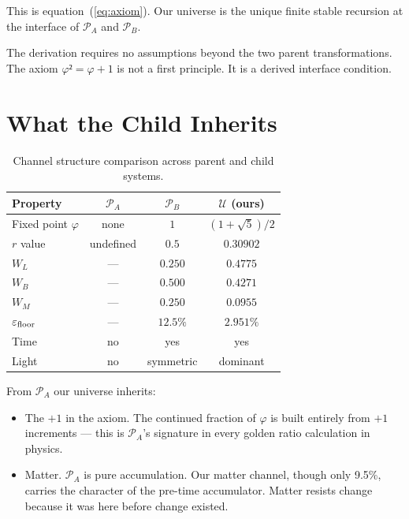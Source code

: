 \documentclass[prd,twocolumn,preprintnumbers,amsmath,amssymb]{revtex4-2}
\newcommand{\parentA}{\mathcal{P}_A}
\newcommand{\parentB}{\mathcal{P}_B}
\newcommand{\child}{\mathcal{U}}
\begin{document}
This is equation~(\ref{eq:axiom}). Our universe is the unique finite
stable recursion at the interface of $\parentA$ and $\parentB$.

The derivation requires no assumptions beyond the two parent
transformations. The axiom $φ² = φ + 1$ is not a first principle.
It is a derived interface condition.

\section{What the Child Inherits}

\begin{table}[h]
\caption{Channel structure comparison across parent and child systems.}
\begin{ruledtabular}
\begin{tabular}{lccc}
Property & $\parentA$ & $\parentB$ & $\child$ (ours) \\
\hline
Fixed point $\varphi$ & none & $1$ & $(1+\sqrt{5})/2$ \\
$r$ value & undefined & $0.5$ & $0.30902$ \\
$W_L$ & --- & $0.250$ & $0.4775$ \\
$W_B$ & --- & $0.500$ & $0.4271$ \\
$W_M$ & --- & $0.250$ & $0.0955$ \\
$\varepsilon_{\rm floor}$ & --- & $12.5\%$ & $2.951\%$ \\
Time & no & yes & yes \\
Light & no & symmetric & dominant \\
\end{tabular}
\end{ruledtabular}
\end{table}

From $\parentA$ our universe inherits:
\begin{itemize}
\item The $+1$ in the axiom. The continued fraction of $\varphi$
      is built entirely from $+1$ increments --- this is $\parentA$'s
      signature in every golden ratio calculation in physics.
\item Matter. $\parentA$ is pure accumulation. Our matter channel,
      though only 9.5\%, carries the character of the pre-time
      accumulator. Matter resists change because it was here before
      change existed.
\end{itemize}
\end{document}
